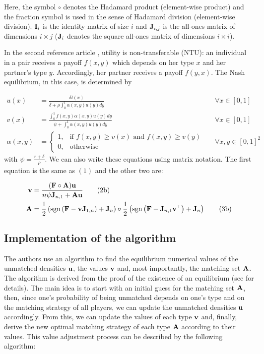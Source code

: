 Here, the symbol $\circ$ denotes the Hadamard product (element-wise product) and the fraction symbol is used in the sense of Hadamard division (element-wise division).
$\boldsymbol{\mathbf{I}}_i$ is the identity matrix of size $i$ and $\boldsymbol{\mathbf{J}}_{i,j}$ is the all-ones matrix of dimensions $i \times j$ ($\boldsymbol{\mathbf{J}}_{i}$ denotes the square all-ones matrix of dimensions $i \times i$).


In the second reference article \citep{smith_marriage_2006}, utility is non-transferable (NTU): an individual in a pair receives a payoff $f(x,y)$ which depends on her type $x$ and her partner's type $y$. Accordingly, her partner receives a payoff $f(y,x)$. The Nash equilibrium, in this case, is determined by

\begin{align*}[left=\empheqlbrace]
	u(x) &= \frac{\delta l(x)}{\delta + \rho \int_{0}^{1} \alpha(x,y) u(y) dy} &&\forall x \in [0,1]\\
	v(x) &= \frac{\int_{0}^{1} f(x,y) \alpha(x,y) u(y) dy}{\psi + \int_{0}^{1} \alpha(x,y) u(y) dy} &&\forall x \in [0,1]\\
	\alpha(x,y) &=
	\begin{cases}
		1, & \text{if } f(x,y) \geq v(x) \text{ and } f(x,y) \geq v(y)\\
		0, & \text{otherwise}
	\end{cases}
	&&\forall x,y \in [0,1]^2 
\end{align*}
with $\psi = \frac{r+\delta}{\rho}$. We can also write these equations using matrix notation. The first equation is the same as $(1)$ and the other two are:

\begin{align}[left=\empheqlbrace]
	\vect{v} &= \frac{(\vect{F} \circ \vect{A})\vect{u}}{n \psi \vect{J}_{n,1} + \vect{A} \vect{u}}
	\tag{2b}\\
	\vect{A} &= \frac{1}{2} \left(\sgn{\left( \vect{F} - \vect{v} \vect{J}_{1,n} \right)} + \vect{J}_n \right) \circ \frac{1}{2} \left(\sgn{\left( \vect{F} - \vect{J}_{n,1} \vect{v}^\top \right)} + \vect{J}_n \right)
	\tag{3b}
\end{align}





\subsection*{Implementation of the algorithm}

The authors use an algorithm to find the equilibrium numerical values of the unmatched densities $\boldsymbol{\mathbf{u}}$, the values $\boldsymbol{\mathbf{v}}$ and, most importantly, the matching set $\boldsymbol{\mathbf{A}}$. The algorithm is derived from the proof of the existence of an equilibrium (see \citep{smith_frictional_2011} for details). The main idea is to start with an initial guess for the matching set $\boldsymbol{\mathbf{A}}$, then, since one's probability of being unmatched depends on one's type and on the matching strategy of all players, we can update the unmatched densities $\boldsymbol{\mathbf{u}}$ accordingly. From this, we can update the values of each type $\boldsymbol{\mathbf{v}}$ and, finally, derive the new optimal matching strategy of each type $\boldsymbol{\mathbf{A}}$ according to their values. This value adjustment process can be described by the following algorithm:

